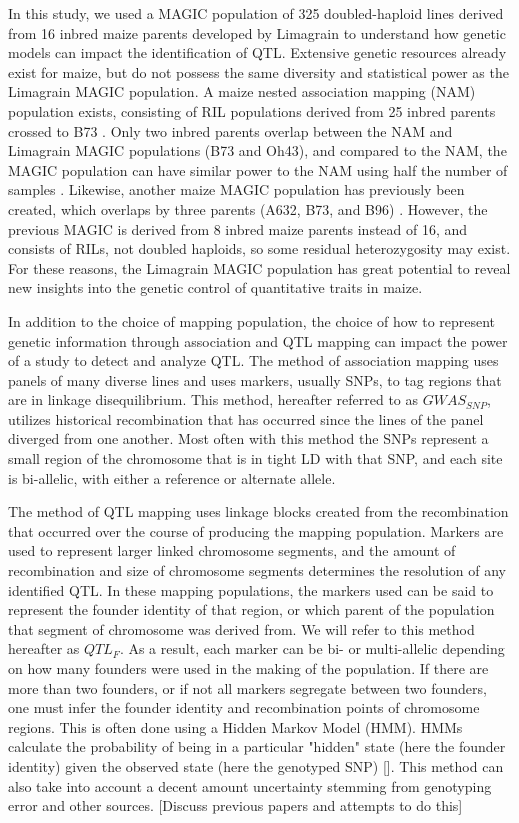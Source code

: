 \documentclass[article,9pt,twocolumn,twoside]{rilabRxiv}
\begin{document}
In this study, we used a MAGIC population of 325 doubled-haploid lines derived from 16 inbred maize parents developed by Limagrain to understand how genetic models can impact the identification of QTL.
Extensive genetic resources already exist for maize, but do not possess the same diversity and statistical power as the Limagrain MAGIC population.
A maize nested association mapping (NAM) population exists, consisting of RIL populations derived from 25 inbred parents crossed to B73 \citep{Yu2}.
Only two inbred parents overlap between the NAM and Limagrain MAGIC populations (B73 and Oh43), and compared to the NAM, the MAGIC population can have similar power to the NAM using half the number of samples \citep{DellAcqua}.
Likewise, another maize MAGIC population has previously been created, which overlaps by three parents (A632, B73, and B96) \citep{DellAcqua}.
However, the previous MAGIC is derived from 8 inbred maize parents instead of 16, and consists of RILs, not doubled haploids, so some residual heterozygosity may exist.
For these reasons, the Limagrain MAGIC population has great potential to reveal new insights into the genetic control of quantitative traits in maize.

In addition to the choice of mapping population, the choice of how to represent genetic information through association and QTL mapping can impact the power of a study to detect and analyze QTL.
The method of association mapping uses panels of many diverse lines and uses markers, usually SNPs, to tag regions that are in linkage disequilibrium.
This method, hereafter referred to as $GWAS_{SNP}$, utilizes historical recombination that has occurred since the lines of the panel diverged from one another.
Most often with this method the SNPs represent a small region of the chromosome that is in tight LD with that SNP, and each site is bi-allelic, with either a reference or alternate allele.

The method of QTL mapping uses linkage blocks created from the recombination that occurred over the course of producing the mapping population.
Markers are used to represent larger linked chromosome segments, and the amount of recombination and size of chromosome segments determines the resolution of any identified QTL.
In these mapping populations, the markers used can be said to represent the founder identity of that region, or which parent of the population that segment of chromosome was derived from. We will refer to this method hereafter as $QTL_F$.
As a result, each marker can be bi- or multi-allelic depending on how many founders were used in the making of the population.
If there are more than two founders, or if not all markers segregate between two founders, one must infer the founder identity and recombination points of chromosome regions.
This is often done using a Hidden Markov Model (HMM). HMMs calculate the probability of being in a particular "hidden" state (here the founder identity) given the observed state (here the genotyped SNP) [].
This method can also take into account a decent amount uncertainty stemming from genotyping error and other sources.
[Discuss previous papers and attempts to do this]
\end{document}

